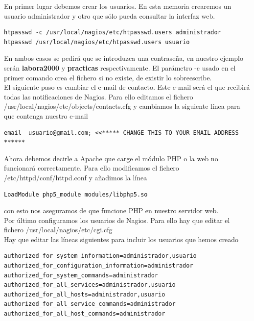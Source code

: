 \documentclass[11pt,a4paper]{article}
\begin{document}
En primer lugar debemos crear los usuarios. En esta memoria crearemos un usuario administrador y otro que sólo pueda consultar la interfaz web.

\begin{verbatim}
htpasswd -c /usr/local/nagios/etc/htpasswd.users administrador
htpasswd /usr/local/nagios/etc/htpasswd.users usuario
\end{verbatim}

En ambos casos se pedirá que se introduzca una contraseña, en nuestro ejemplo serán \textbf{labora2000} y \textbf{practicas} respectivamente. El parámetro -c usado en el primer comando crea el fichero si no existe, de existir lo sobreescribe.
\\

El siguiente paso es cambiar el e-mail de contacto. Este e-mail será el que recibirá todas las notificaciones de Nagios. Para ello editamos el fichero /usr/local/nagios/etc/objects/contacts.cfg y cambiamos la siguiente línea para que contenga nuestro e-mail

\begin{verbatim}
email  usuario@gmail.com; <<***** CHANGE THIS TO YOUR EMAIL ADDRESS ******
\end{verbatim}

Ahora debemos decirle a Apache que carge el módulo PHP o la web no funcionará correctamente. Para ello modificamos el fichero /etc/httpd/conf/httpd.conf y añadimos la línea

\begin{verbatim}
LoadModule php5_module modules/libphp5.so
\end{verbatim}

con esto nos aseguramos de que funcione PHP en nuestro servidor web.
\\

Por último configuramos los usuarios de Nagios. Para ello hay que editar el fichero /usr/local/nagios/etc/cgi.cfg
\\

Hay que editar las líneas siguientes para incluir los usuarios que hemos creado

\begin{verbatim}
authorized_for_system_information=administrador,usuario
authorized_for_configuration_information=administrador
authorized_for_system_commands=administrador
authorized_for_all_services=administrador,usuario
authorized_for_all_hosts=administrador,usuario
authorized_for_all_service_commands=administrador
authorized_for_all_host_commands=administrador
\end{verbatim}
\end{document}

